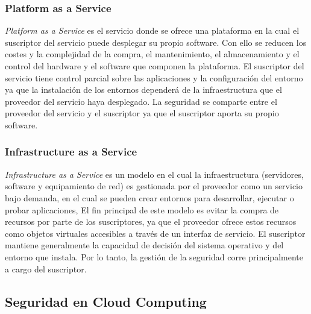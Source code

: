 \subsubsection{Platform as a Service}

\emph{Platform as a Service} es el servicio donde se ofrece una plataforma en la cual el suscriptor del servicio puede desplegar su propio software. Con ello se reducen los costes y la complejidad de la compra, el mantenimiento, el almacenamiento y el control del hardware y el software que componen la plataforma. El suscriptor del servicio tiene control parcial sobre las aplicaciones y la configuración del entorno ya que la instalación de los entornos dependerá de la infraestructura que el proveedor del servicio haya desplegado. La seguridad se comparte entre el proveedor del servicio y el suscriptor ya que el suscriptor aporta su propio software.

\subsubsection{Infrastructure as a Service}

\emph{Infrastructure as a Service} es un modelo en el cual la infraestructura (servidores, software y equipamiento de red) es gestionada por el proveedor como un servicio bajo demanda, en el cual se pueden crear entornos para desarrollar, ejecutar o probar aplicaciones, El fin principal de este modelo es evitar la compra de recursos por parte de los suscriptores, ya que el proveedor ofrece estos recursos como objetos virtuales accesibles a través de un interfaz de servicio. El suscriptor mantiene generalmente la capacidad de decisión del sistema operativo y del entorno que instala. Por lo tanto, la gestión de la seguridad corre principalmente a cargo del suscriptor.

\subsection{Seguridad en Cloud Computing}

